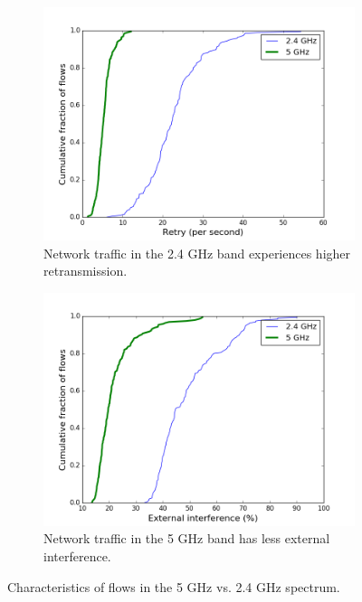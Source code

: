 \begin{figure}
\hspace*{\fill} %
\begin{subfigure}{0.45\textwidth}
\includegraphics[width=\linewidth]{figure/retries(2g_vs_5g).png}
\caption{Network traffic in the 2.4 GHz band experiences higher retransmission.} 
\label{fig:retries}
\end{subfigure}
\hspace*{\fill} %
\begin{subfigure}{0.5\textwidth}
\includegraphics[width=\linewidth]{figure/external_interference(2g_vs_5g).png}
\caption{Network traffic in the 5 GHz band has less external interference.} 
\label{fig:interference}
\end{subfigure}
\caption{Characteristics of flows in the 5 GHz vs. 2.4 GHz spectrum.} 
\label{fig:5gvs2g}
\end{figure}

